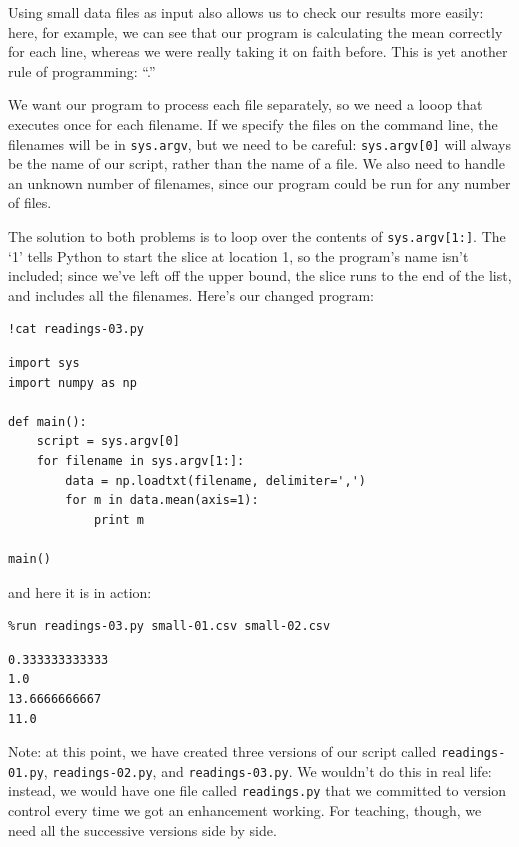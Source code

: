 \documentclass{book}
\begin{document}
Using small data files as input also allows us to check our results more
easily: here, for example, we can see that our program is calculating
the mean correctly for each line, whereas we were really taking it on
faith before. This is yet another rule of programming:
``.''

We want our program to process each file separately, so we need a looop
that executes once for each filename. If we specify the files on the
command line, the filenames will be in \texttt{sys.argv}, but we need to
be careful: \texttt{sys.argv{[}0{]}} will always be the name of our
script, rather than the name of a file. We also need to handle an
unknown number of filenames, since our program could be run for any
number of files.

The solution to both problems is to loop over the contents of
\texttt{sys.argv{[}1:{]}}. The `1' tells Python to start the slice at
location 1, so the program's name isn't included; since we've left off
the upper bound, the slice runs to the end of the list, and includes all
the filenames. Here's our changed program:

\begin{verbatim}
!cat readings-03.py
\end{verbatim}

\begin{verbatim}
import sys
import numpy as np

def main():
    script = sys.argv[0]
    for filename in sys.argv[1:]:
        data = np.loadtxt(filename, delimiter=',')
        for m in data.mean(axis=1):
            print m

main()
\end{verbatim}

and here it is in action:

\begin{verbatim}
%run readings-03.py small-01.csv small-02.csv
\end{verbatim}

\begin{verbatim}
0.333333333333
1.0
13.6666666667
11.0
\end{verbatim}

Note: at this point, we have created three versions of our script called
\texttt{readings-01.py}, \texttt{readings-02.py}, and
\texttt{readings-03.py}. We wouldn't do this in real life: instead, we
would have one file called \texttt{readings.py} that we committed to
version control every time we got an enhancement working. For teaching,
though, we need all the successive versions side by side.
\end{document}
